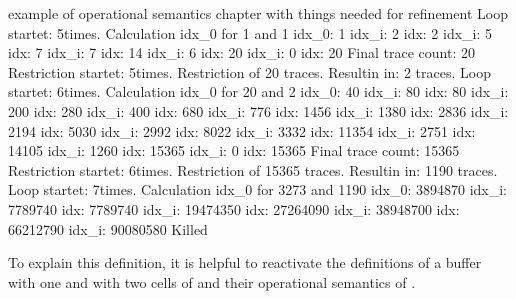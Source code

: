 \begin{old}{example of operational semantics chapter with things needed for refinement}
Loop startet: 5times.
Calculation idx_0 for 1 and 1
idx_0: 1
idx_i: 2
idx: 2
idx_i: 5
idx: 7
idx_i: 7
idx: 14
idx_i: 6
idx: 20
idx_i: 0
idx: 20
Final trace count: 20
Restriction startet: 5times.
Restriction of 20 traces.
Resultin in: 2 traces.
Loop startet: 6times.
Calculation idx_0 for 20 and 2
idx_0: 40
idx_i: 80
idx: 80
idx_i: 200
idx: 280
idx_i: 400
idx: 680
idx_i: 776
idx: 1456
idx_i: 1380
idx: 2836
idx_i: 2194
idx: 5030
idx_i: 2992
idx: 8022
idx_i: 3332
idx: 11354
idx_i: 2751
idx: 14105
idx_i: 1260
idx: 15365
idx_i: 0
idx: 15365
Final trace count: 15365
Restriction startet: 6times.
Restriction of 15365 traces.
Resultin in: 1190 traces.
Loop startet: 7times.
Calculation idx_0 for 3273 and 1190
idx_0: 3894870
idx_i: 7789740
idx: 7789740
idx_i: 19474350
idx: 27264090
idx_i: 38948700
idx: 66212790
idx_i: 90080580
Killed



To explain this definition, it is helpful to reactivate the definitions of a buffer with one and with two cells of  and their operational semantics of . 


\end{old}
